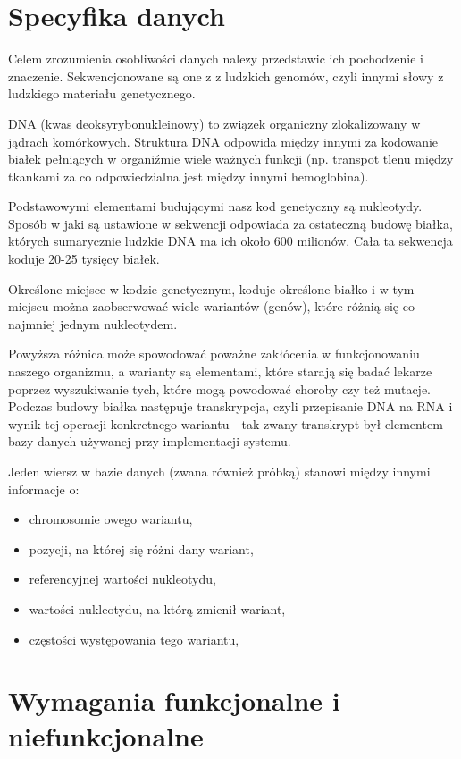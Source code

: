 \documentclass[a4paper,12pt,twoside]{article}
\begin{document}
\newpage
\section{Specyfika danych}  
Celem zrozumienia osobliwości danych nalezy przedstawic ich pochodzenie 
i znaczenie. Sekwencjonowane są one z z ludzkich genomów, czyli innymi słowy z ludzkiego materiału genetycznego. 

DNA (kwas deoksyrybonukleinowy) to związek organiczny zlokalizowany w jądrach komórkowych. 
Struktura DNA odpowida między innymi za kodowanie białek pełniących w organiźmie wiele ważnych funkcji (np. transpot tlenu między tkankami za co 
odpowiedzialna jest między innymi hemoglobina).

Podstawowymi elementami budującymi nasz kod genetyczny są
nukleotydy. Sposób w jaki są ustawione w sekwencji odpowiada
za ostateczną budowę białka, których sumarycznie ludzkie DNA ma ich około 
600 milionów. Cała ta sekwencja koduje 20-25 tysięcy białek.

Określone miejsce w kodzie genetycznym, koduje określone białko
i w tym miejscu można zaobserwować wiele wariantów (genów), 
które różnią się co najmniej jednym nukleotydem.

Powyższa różnica może spowodować poważne 
zakłócenia w funkcjonowaniu naszego organizmu, a warianty
są elementami, które starają się badać
lekarze poprzez wyszukiwanie tych, które mogą powodować choroby
czy też mutacje.
Podczas budowy białka następuje transkrypcja, czyli przepisanie DNA na RNA
i wynik tej operacji konkretnego wariantu - tak zwany transkrypt był elementem bazy danych używanej przy implementacji systemu.
 
Jeden wiersz w bazie danych (zwana również próbką) stanowi między innymi informacje o:
\begin{itemize}
\item chromosomie owego wariantu,
\item pozycji, na której się różni dany wariant,
\item referencyjnej wartości nukleotydu,
\item wartości nukleotydu, na którą zmienił wariant,
\item częstości występowania tego wariantu,
\end{itemize}



\newpage
\section{Wymagania funkcjonalne i niefunkcjonalne}  
\end{document}
